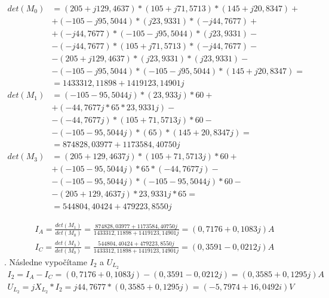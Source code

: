 \documentclass[a4paper,12pt]{article}
\begin{document}
\begin{equation*}
    \begin{split}
	det(M_0) &= (205 +j129,4637)*(105+j71,5713)*(145+j20,8347) + \\
	&+ (-105-j95,5044)*( j23,9331)*(-j44,7677) + \\
	&+(-j44,7677)*(-105 -j95,5044 )*(j23,9331) - \\
	&-(-j44,7677)*( 105+j71,5713) * (-j44,7677) - \\
	&-(205 +j129,4637 ) * (j23,9331) * (j23,9331 ) - \\
	&-(-105-j95,5044)*(-105-j95,5044) * (145+j20,8347) = \\
	&= 1433312,11898 + 1419123,14901j \\
	det(M_1) &= (-105-95,5044j)*(23,933j)*60 + \\
	&+(-44,7677j*65*23,9331j) - \\
	&-(-44,7677j)*(105+71,5713j)*60 - \\
	&-(-105-95,5044j)*(65)*(145+20,8347j) = \\
	&=874828,03977 + 1173584,40750j \\
	det(M_3) &=(205+129,4637j)*(105+71,5713j)*60 + \\
	&+ (-105-95,5044j)*65*(-44,7677j)  - \\
	&-(-105-95,5044j)*(-105-95,5044j)*60 - \\
	&-(205+129,4637j)*23,9331j*65 = \\
	&=544804,40424 + 479223,8550j 
    \end{split}
\end{equation*}

\begin{equation*}
    \begin{split}
	I_A = \frac{det(M_1)}{det(M_0)} = \frac{874828,03977 + 1173584,40750j}{1433312,11898 + 1419123,14901j} = (0,7176 + 0,1083j) A \\
	I_C = \frac{det(M_3)}{det(M_0)} = \frac{544804,40424 + 479223,8550j}{1433312,11898 + 1419123,14901j} = (0,3591 - 0,0212j) A
    \end{split}
\end{equation*}
. Následne vypočítame $I_2$ a $U_{L_2}$
\begin{equation*}
\begin{split}
I_2 = I_A - I_C = (0,7176 + 0,1083j) -  (0,3591 - 0,0212j) =(0,3585 + 0,1295j) A \\
U_{L_2} = jX_{L_2} * I_2 =j44,7677 * (0,3585 + 0,1295j)= (-5,7974 + 16,0492i) V
\end{split}
\end{equation*}
\end{document}
